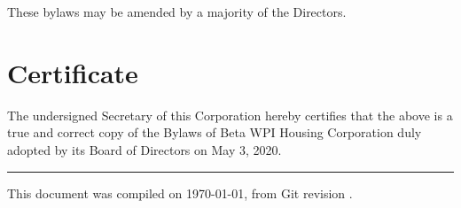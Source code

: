 \documentclass[12pt]{report}
\newcommand{\dateadopted}{May 3, 2020}
\begin{document}
These bylaws may be amended by a majority of the Directors.

\chapter*{Certificate}
\thispagestyle{certificate}

The undersigned Secretary of this Corporation hereby certifies that the above is a true and correct copy of the Bylaws of Beta WPI Housing Corporation duly adopted by its Board of Directors on \dateadopted.

\vspace{0.4in}
\rule{3in}{0.8pt}

\vfill
\begin{center}
\small This document was compiled on \today, from Git revision \Revision.
\end{center}
\end{document}
